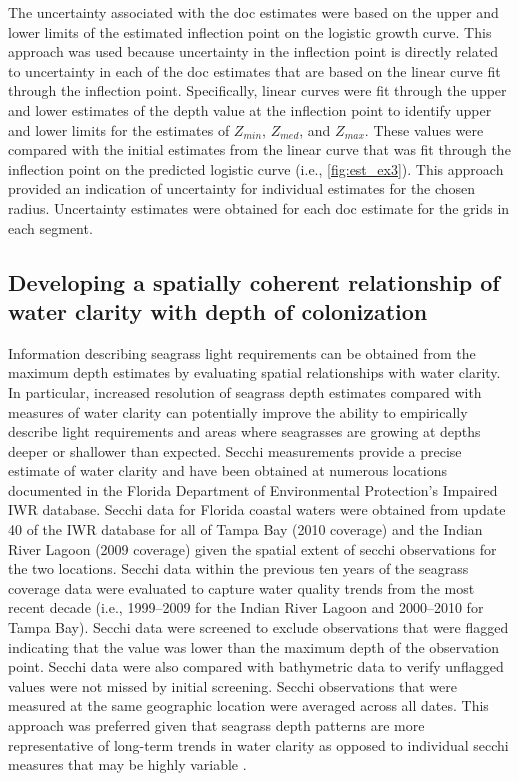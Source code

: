 \documentclass[letterpaper,12pt,oneside]{article}\usepackage[]{graphicx}\usepackage[]{color}
\begin{document}
The uncertainty associated with the \ac{doc} estimates were based on the upper and lower limits of the estimated inflection point on the logistic growth curve.  This approach was used because uncertainty in the inflection point is directly related to uncertainty in each of the \ac{doc} estimates that are based on the linear curve fit through the inflection point.   Specifically, linear curves were fit through the upper and lower estimates of the depth value at the inflection point to identify upper and lower limits for the estimates of $Z_{min}$, $Z_{med}$, and $Z_{max}$.  These values were compared with the initial estimates from the linear curve that was fit through the inflection point on the predicted logistic curve (i.e., \cref{fig:est_ex3}).  This approach provided an indication of uncertainty for individual estimates for the chosen radius.  Uncertainty estimates were obtained for each \ac{doc} estimate for the grids in each segment.

\subsection{Developing a spatially coherent relationship of water clarity with depth of colonization}

Information describing seagrass light requirements can be obtained from the maximum depth estimates by evaluating spatial relationships with water clarity.  In particular, increased resolution of seagrass depth estimates compared with measures of water clarity can potentially improve the ability to empirically describe light requirements and areas where seagrasses are growing at depths deeper or shallower than expected. Secchi measurements provide a precise estimate of water clarity and have been obtained at numerous locations documented in the Florida Department of Environmental Protection's Impaired \ac{IWR} database. Secchi data for Florida coastal waters were obtained from update 40 of the \ac{IWR} database for all of Tampa Bay (2010 coverage) and the Indian River Lagoon (2009 coverage) given the spatial extent of secchi observations for the two locations.  Secchi data within the previous ten years of the seagrass coverage data were evaluated to capture water quality trends from the most recent decade (i.e., 1999--2009 for the Indian River Lagoon and 2000--2010 for Tampa Bay).  Secchi data were screened to exclude observations that were flagged indicating that the value was lower than the maximum depth of the observation point.  Secchi data were also compared with bathymetric data to verify unflagged values were not missed by initial screening.  Secchi observations that were measured at the same geographic location were averaged across all dates.  This approach was preferred given that seagrass depth patterns are more representative of long-term trends in water clarity as opposed to individual secchi measures that may be highly variable \citep{Dennison87,Dennison93}.
\end{document}
